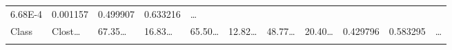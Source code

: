 \documentclass[
]{article}
\begin{document}
\begin{longtable}[]{@{}lllllllllll@{}}
\begin{minipage}[t]{0.09\columnwidth}
6.68E-4\strut
\end{minipage} & \begin{minipage}[t]{0.06\columnwidth}\raggedright
0.001157\strut
\end{minipage} & \begin{minipage}[t]{0.06\columnwidth}\raggedright
0.499907\strut
\end{minipage} & \begin{minipage}[t]{0.06\columnwidth}\raggedright
0.633216\strut
\end{minipage} & \begin{minipage}[t]{0.03\columnwidth}\raggedright
\ldots{}\strut
\end{minipage}\tabularnewline
\begin{minipage}[t]{0.06\columnwidth}\raggedright
Class\strut
\end{minipage} & \begin{minipage}[t]{0.06\columnwidth}\raggedright
Clost\ldots{}\strut
\end{minipage} & \begin{minipage}[t]{0.09\columnwidth}\raggedright
67.35\ldots{}\strut
\end{minipage} & \begin{minipage}[t]{0.06\columnwidth}\raggedright
16.83\ldots{}\strut
\end{minipage} & \begin{minipage}[t]{0.09\columnwidth}\raggedright
65.50\ldots{}\strut
\end{minipage} & \begin{minipage}[t]{0.06\columnwidth}\raggedright
12.82\ldots{}\strut
\end{minipage} & \begin{minipage}[t]{0.09\columnwidth}\raggedright
48.77\ldots{}\strut
\end{minipage} & \begin{minipage}[t]{0.06\columnwidth}\raggedright
20.40\ldots{}\strut
\end{minipage} & \begin{minipage}[t]{0.06\columnwidth}\raggedright
0.429796\strut
\end{minipage} & \begin{minipage}[t]{0.06\columnwidth}\raggedright
0.583295\strut
\end{minipage} & \begin{minipage}[t]{0.03\columnwidth}\raggedright
\ldots{}\strut
\end{minipage}\tabularnewline
\begin{minipage}[t]{0.06\columnwidth}\raggedright

\end{minipage}
\end{longtable}
\end{document}
